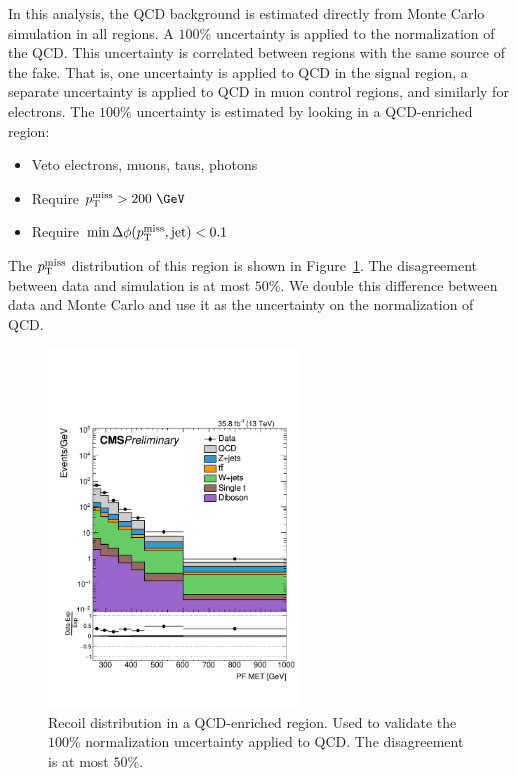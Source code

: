 In this analysis, the QCD background is estimated directly from Monte Carlo simulation in all regions. A $100\%$ uncertainty is applied to the normalization of the QCD. This uncertainty is correlated between regions with the same source of the fake. That is, one uncertainty is applied to QCD in the signal region, a separate uncertainty is applied to QCD in muon control regions, and similarly for electrons. The $100\%$ uncertainty is estimated by looking in a QCD-enriched region:
\begin{itemize}
  \item Veto electrons, muons, taus, photons
  \item Require $\MET>200~\GeV$
  \item Require $\min\Delta\phi(p_{\mathrm{T}}^{\text{miss}},\text{jet})<0.1$
\end{itemize}
The $p_{\mathrm{T}}^{\text{miss}}$ distribution of this region is shown in Figure~\ref{fig:qcdcr}. The disagreement between data and simulation is at most $50\%$. We double this difference between data and Monte Carlo and use it as the uncertainty on the normalization of QCD.

\begin{figure}[htbp]
  \centering
        \includegraphics[width=0.6\textwidth]{figures/prefit/onefatjet_m50/qcd_pfmet_logy.pdf}
  \caption{Recoil distribution in a QCD-enriched region. Used to validate the $100\%$ normalization uncertainty applied to QCD. The disagreement is at most $50\%$. }
  \label{fig:qcdcr}
\end{figure}

